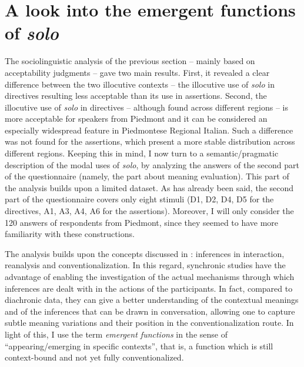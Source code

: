 \section{A look into the emergent functions of \textit{solo}}
\hypertarget{Toc124860676}{}
The sociolinguistic analysis of the previous section – mainly based on acceptability judgments – gave two main results. First, it revealed a clear difference between the two illocutive contexts – the illocutive use of \textit{solo} in directives resulting less acceptable than its use in assertions. Second, the illocutive use of \textit{solo} in directives – although found across different regions – is more acceptable for speakers from Piedmont and it can be considered an especially widespread feature in Piedmontese Regional Italian. Such a difference was not found for the assertions, which present a more stable distribution across different regions. Keeping this in mind, I now turn to a semantic/pragmatic description of the modal uses of \textit{solo}, by analyzing the answers of the second part of the questionnaire (namely, the part about meaning evaluation). This part of the analysis builds upon a limited dataset. As has already been said, the second part of the questionnaire covers only eight stimuli (D1, D2, D4, D5 for the directives, A1, A3, A4, A6 for the assertions). Moreover, I will only consider the 120 answers of respondents from Piedmont, since they seemed to have more familiarity with these constructions.

The analysis builds upon the concepts discussed in : inferences in interaction, reanalysis and conventionalization. In this regard, synchronic studies have the advantage of enabling the investigation of the actual mechanisms through which inferences are dealt with in the actions of the participants. In fact, compared to diachronic data, they can give a better understanding of the contextual meanings and of the inferences that can be drawn in conversation, allowing one to capture subtle meaning variations and their position in the conventionalization route. In light of this, I use the term \textit{emergent functions} in the sense of “appearing/emerging in specific contexts”, that is, a function which is still context-bound and not yet fully conventionalized.

